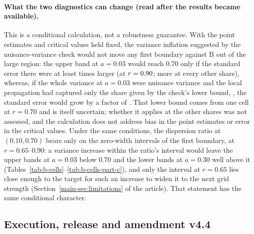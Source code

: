 \paragraph{What the two diagnostics can change (read after the results became available).}
This is a conditional calculation, not a robustness guarantee. With the point estimates and critical values held fixed, the variance inflation suggested by the nuisance-variance check would not move any first boundary against B out of the large region: the upper band at $a=0.03$ would reach 0.70 only if the standard error there were at least  times larger (at $r=\resultnum{j.b.margin.a0300.se_factor.min.r}{0.90}$; more at every other share), whereas, if the whole variance at $a=0.03$ were nuisance variance and the local propagation had captured only the share given by the check's lower bound, , the standard error would grow by a factor of . That lower bound comes from one cell at $r=0.70$ and is itself uncertain; whether it applies at the other shares was not assessed, and the calculation does not address bias in the point estimates or error in the critical values. Under the same conditions, the dispersion ratio at $(0.10,0.70)$ bears only on the zero-width intervals of the first boundary, at $r=0.65$--0.90: a variance increase within the ratio's interval would leave the upper bands at $a=0.03$ below 0.70 and the lower bands at $a=0.30$ well above it (Tables~\ref{tab:b-cells}--\ref{tab:b-cells-part-c}), and only the interval at $r=0.65$ lies close enough to the target for such an increase to widen it to the next grid strength (Section~\ref{main-sec:limitations} of the article). That statement has the same conditional character.



\subsection{Execution, release and amendment v4.4}\label{sec:record-execution}\label{supp:execution-records}

